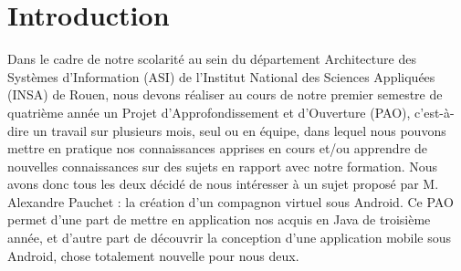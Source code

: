 \section*{Introduction}


Dans le cadre de notre scolarité au sein du département Architecture des Systèmes d’Information (ASI) de l’Institut National des Sciences Appliquées (INSA) de Rouen, nous devons réaliser au cours de notre premier semestre de quatrième année un Projet d’Approfondissement et d’Ouverture (PAO), c’est-à-dire un travail sur plusieurs mois, seul ou en équipe, dans lequel nous pouvons mettre en pratique nos connaissances apprises en cours et/ou apprendre de nouvelles connaissances sur des sujets en rapport avec notre formation.
Nous avons donc tous les deux décidé de nous intéresser à un sujet proposé par M. Alexandre Pauchet : la création d’un compagnon virtuel sous Android. Ce PAO permet d’une part de mettre en application nos acquis en Java de troisième année, et d’autre part de découvrir la conception d’une application mobile sous Android, chose totalement nouvelle pour nous deux.
